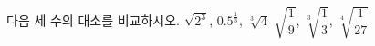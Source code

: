 다음 세 수의 대소를 비교하시오.
 $\sqrt{2^3}$, $0.5^{\frac{1}{3}}$, $\sqrt[3]{4}$
 $\sqrt{\dfrac{1}{9}}$, $\sqrt[3]{\dfrac{1}{3}}$, $\sqrt[4]{\dfrac{1}{27}}$
